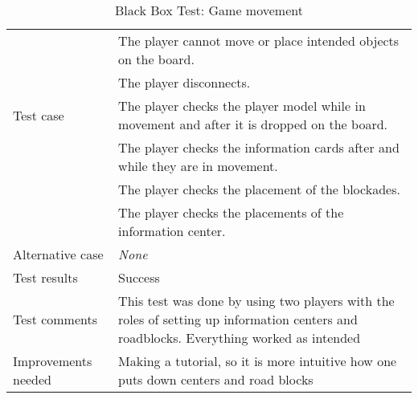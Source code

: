 {\begin{table}[H]
\begin{tabular}{| p{5cm} | p{10cm} |}
		& The player cannot move or place intended objects on the board. \\
		& The player disconnects. \\ \hline
	Test case
		& The player checks the player model while in movement and after it is dropped on the board.\\
		& The player checks the information cards after and while they are in movement.\\
		& The player checks the placement of the blockades.\\ 
		& The player checks the placements of the information center. \\ \hline
	Alternative case
		& \emph{None}\\ \hline
	Test results 
		& Success \\ \hline
	Test comments
		& This test was done by using two players with the roles of setting up information centers and roadblocks. Everything worked as intended \\ \hline
	Improvements needed
		& Making a tutorial, so it is more intuitive how one puts down centers and road blocks \\ \hline
\end{tabular}


\caption{Black Box Test: Game movement}
\label{fig:black_box_test_4}
\end{table}}



